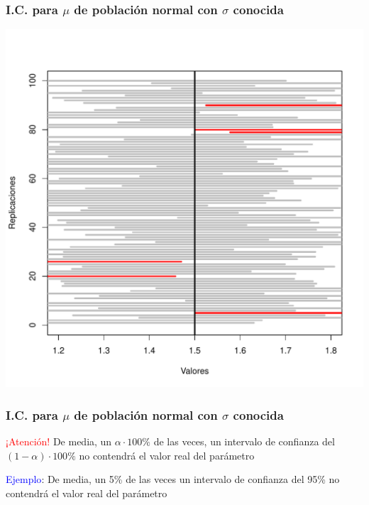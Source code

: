 \documentclass[12pt,t]{beamer}\usepackage[]{graphicx}\usepackage[]{color}
\newenvironment{knitrout}{}{} %
\newcommand{\red}[1]{\textcolor{red}{#1}}
\newcommand{\blue}[1]{\textcolor{blue}{#1}}
\theoremstyle{plain}
\theoremstyle{definition}
\begin{document}
\begin{frame}

\frametitle{I.C. para $\mu$ de población normal con $\sigma$ conocida}
\vspace*{-1cm}

\begin{knitrout}
\color{fgcolor}
\includegraphics[width=0.9\linewidth]{figure/plot_intervalos-1} 

\end{knitrout}




\end{frame}

\begin{frame}[fragile]
\frametitle{I.C. para $\mu$ de población normal con $\sigma$ conocida}

\begin{block}{\red{¡Atención!}}
De media, un $\alpha\cdot 100\%$ de las veces, un intervalo de confianza  del $(1-\alpha)\cdot 100\%$  no contendrá el valor real del parámetro 
\end{block}

\blue{Ejemplo}: De media, un 5\% de las veces un intervalo de confianza  del 95\% no contendrá el valor real del parámetro

\end{frame}
\end{document}
